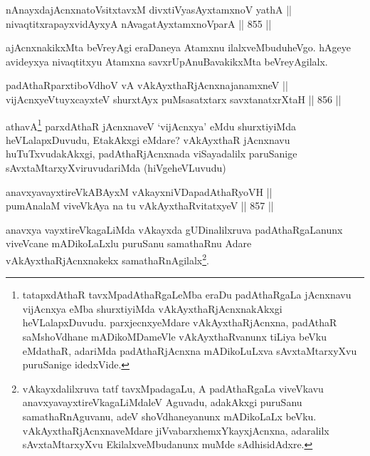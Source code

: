 \begin{shl}
nAnayxdajAcnxnatoV\s sitxtavxM divxtiVyasAyx\s \s tamxnoV yathA || \\
nivaqtitxrapayxvidAyxyA nAvagatAyxtamxnoV\s parA \hfill || 855 ||  
\end{shl}

\begin{artha}
ajAcnxnakikxMta beVreyAgi eraDaneya Atamxnu ilalxveMbudu\break heVgo. hAgeye avideyxya nivaqtitxyu Atamxna savxrUpAnuBavakikxMta beVreyAgilalx.
\end{artha}


\begin{shl}
padAthaRparxtiboVdhoV vA vAkAyxthaRjAcnxnajanamxneV || \\
vijAcnxyeVtuyxcayxteV shurxtAyx puMsasatxtarx savxtanatxrXtaH \hfill || 856 ||  
\end{shl}

\begin{artha}
athavA\footnote{tatapxdAthaR tavxMpadAthaRgaLeMba eraDu padAthaRgaLa jAcnxnavu vijAcnxya eMba shurxtiyiMda vAkAyxthaRjAcnxnakAkxgi heVLalapxDuvudu. parxjecnxyeMdare vAkAyxthaRjAcnxna, padAthaR saMshoVdhane mADikoMDameVle vAkAyxthaRvanunx tiLiya beVku eMdathaR, adariMda padAthaRjAcnxna mADikoLuLxva sAvxtaMtarxyXvu puruSanige idedxVide.} parxdAthaR jAcnxnaveV `vijAcnxya' eMdu shurxtiyiMda heVLalapxDuvudu, EtakAkxgi eMdare? vAkAyxthaR jAcnxnavu huTuTxvudakAkxgi, padAthaRjAcnxnada viSayadalilx paruSanige sAvxtaMtarxyXviruvudariMda (hiVgeheVLuvudu)
\end{artha}


\begin{shl}
anavxyavayxtireVkABAyxM vAkayxniVDapadAthaRyoVH || \\
pumAnalaM viveVkAya na tu vAkAyxthaRvitatxyeV \hfill || 857 ||  
\end{shl}

\begin{artha}
anavxya vayxtireVkagaLiMda vAkayxda gUDinalilxruva padAthaRgaLanunx viveVcane mADikoLaLxlu puruSanu samathaRnu Adare vAkAyxthaR\-jAcnxnakekx samathaRnAgilalx\footnote{vAkayxdalilxruva tatf tavxMpadagaLu, A padAthaRgaLa viveVkavu anavxyavayxtireVkagaLiMdaleV Aguvadu, adakAkxgi puruSanu samathaRnAguvanu, adeV shoVdhaneyanunx mADikoLaLx beVku. vAkAyxthaRjAcnxnaveMdare jiVvabarxhemxYkayxjAcnxna, adaralilx sAvxtaMtarxyXvu EkilalxveMbudanunx muMde sAdhisidAdxre.}.
\end{artha}

